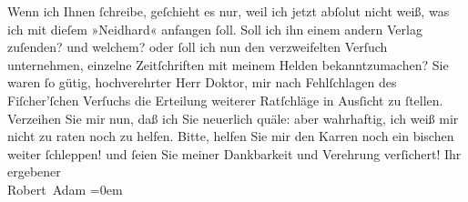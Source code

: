 \begin{ledgroupsized}[t]{13cm}
           \pstart
           Wenn ich Ihnen ſchreibe, geſchieht es nur, weil ich jetzt abſolut nicht weiß, was ich
               mit dieſem »Neidhard« anfangen ſoll. Soll ich ihn
               einem andern Verlag zuſenden? und welchem? oder ſoll ich nun den verzweifelten
               Verſuch unternehmen, einzelne Zeitſchriften mit meinem Helden bekanntzumachen?\pend
           \pstart
           Sie waren ſo gütig, hochverehrter Herr Doktor, mir nach Fehlſchlagen des Fiſcher’ſchen Verſuchs die Erteilung weiterer
               Ratſchläge in Ausſicht zu ſtellen. Verzeihen Sie mir nun, daß ich Sie neuerlich
               quäle: aber wahrhaftig, ich weiß mir nicht zu raten noch zu helfen.\pend
           \pstart
           Bitte, helfen Sie mir den Karren noch ein bischen weiter ſchleppen! und ſeien Sie
               meiner Dankbarkeit und {\pb}Verehrung verſichert!\pend
           \pstart
           Ihr ergebener{\\[\baselineskip]}\spacefill\mbox{Robert Adam}\pend
           \leftskip=0em{}
         
         \endnumbering{}\end{ledgroupsized}  \newcommand{\dateiname}{L02009}\newcommand{\titel}{Robert Adam an Arthur Schnitzler, 9. 2. 1911}\newcommand{\editorInnen}{Martin Anton Müller und Gerd-Hermann Susen}
      
